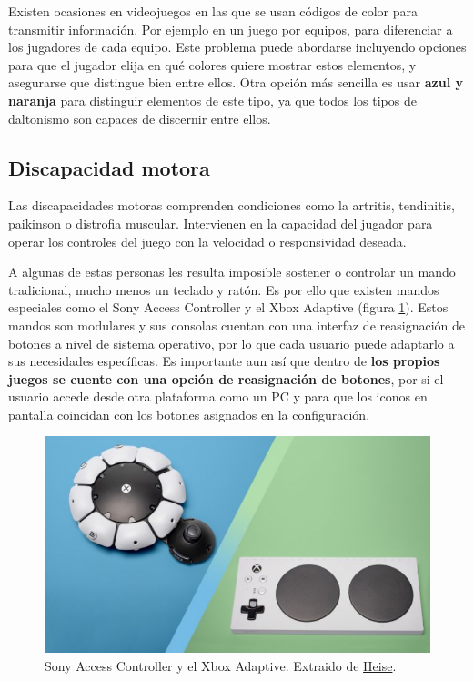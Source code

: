 Existen ocasiones en videojuegos en las que se usan códigos de color para transmitir información. Por ejemplo en un juego por equipos, para diferenciar a los jugadores de cada equipo. Este problema puede abordarse incluyendo opciones para que el jugador elija en qué colores quiere mostrar estos elementos, y asegurarse que distingue bien entre ellos. Otra opción más sencilla es usar \textbf{azul y naranja} para distinguir elementos de este tipo, ya que todos los tipos de daltonismo son capaces de discernir entre ellos.

\subsection{Discapacidad motora}

Las discapacidades motoras comprenden condiciones como la artritis, tendinitis, paikinson o distrofia muscular. Intervienen en la capacidad del jugador para operar los controles del juego con la velocidad o responsividad deseada.

A algunas de estas personas les resulta imposible sostener o controlar un mando tradicional, mucho menos un teclado y ratón. Es por ello que existen mandos especiales como el Sony Access Controller y el Xbox Adaptive (figura \ref{fig:controllers}). Estos mandos son modulares y sus consolas cuentan con una interfaz de reasignación de botones a nivel de sistema operativo, por lo que cada usuario puede adaptarlo a sus necesidades específicas. Es importante aun así que dentro de \textbf{los propios juegos se cuente con una opción de reasignación de botones}, por si el usuario accede desde otra plataforma como un PC y para que los iconos en pantalla coincidan con los botones asignados en la configuración.

\begin{figure}[h]
    \centering
    \includegraphics[scale=0.48]{img/accesible-controls.png}
    \caption[Sony Access Controller y el Xbox Adaptive]{Sony Access Controller y el Xbox Adaptive. Extraido de \href{https://www.heise.de/tests/Sony-Access-und-Xbox-Adaptive-Barrierefreie-Gaming-Controller-im-Vergleich-9645431.html}{Heise}.}
    \label{fig:controllers}
\end{figure}

